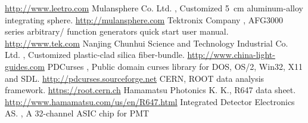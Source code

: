 \documentclass{nst}
\providecommand{\DIFadd}[1]{{\protect\color{yellow} #1}} %
\providecommand{\DIFaddbegin}{} %
\providecommand{\DIFaddend}{} %
\providecommand{\DIFdelbegin}{} %
\providecommand{\DIFdelend}{} %
\begin{document}
\begin{thebibliography}{99}
\DIFdelend \DIFaddbegin \href{http://www.leetro.com/english/}{http://www.leetro.com}
	\DIFaddend {} {Mulansphere Co. Ltd.}\DIFaddbegin \DIFadd{, }\DIFaddend {Customized \DIFdelbegin \DIFdelend \DIFaddbegin \SI{5}{cm} \DIFadd{aluminum-alloy integrating sphere}\DIFaddend }. \DIFdelbegin %
\DIFdelend \DIFaddbegin \href{http://mulansphere.com/e-index.html/}{http://mulansphere.com}
	\DIFaddend {} {Tektronix Company}\DIFdelbegin \DIFdelend \DIFaddbegin \DIFadd{, }\DIFaddend {AFG3000 \DIFdelbegin \DIFdelend \DIFaddbegin \DIFadd{series arbitrary}\DIFaddend /\DIFdelbegin \DIFdelend \DIFaddbegin \DIFadd{function generators quick start user manual}\DIFaddend }. \DIFdelbegin %
\DIFdelend \DIFaddbegin \href{http://www.tek.com/signal-generator/afg3000-function-generator/}{http://www.tek.com}
	\DIFaddend {} Nanjing Chunhui Science and Technology Industrial Co. Ltd.\DIFdelbegin %
\DIFdelend \DIFaddbegin \DIFadd{, Customized plastic-clad silica fiber-bundle.  }\href{http://www.china-light-guides.com/}{http://www.china-light-guides.com}
	\DIFaddend {} PDCurses\DIFdelbegin \DIFdelend \DIFaddbegin \DIFadd{,  Public domain curses library }\DIFaddend for DOS, OS/2, Win32, X11 and SDL. \DIFdelbegin %
\DIFdelend \DIFaddbegin \href{http://pdcurses.sourceforge.net/}{http://pdcurses.sourceforge.net}
	\DIFaddend {} \DIFdelbegin %
\DIFdelend \DIFaddbegin \DIFadd{CERN,  ROOT data analysis framework. }\href{https://root.cern.ch/}{https://root.cern.ch}
	 \DIFadd{Hamamatsu Photonics K. K., R647 data sheet.
	}\href{http://www.hamamatsu.com/us/en/R647.html}{http://www.hamamatsu.com/us/en/R647.html}
	\DIFaddend {} Integrated Detector Electronics AS.\DIFaddbegin \DIFadd{, }\DIFaddend A 32-channel ASIC chip for PMT \DIFdelbegin %

\end{thebibliography}
\end{document}
